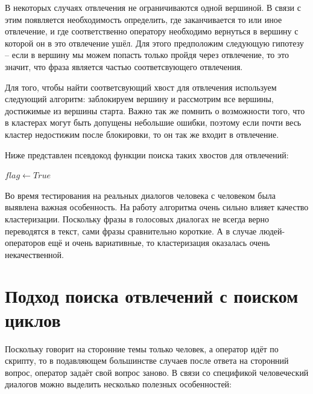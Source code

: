 \documentclass[specification,annotation]{itmo-student-thesis}
\begin{document}
	В некоторых случаях отвлечения не ограничиваются одной вершиной. В связи с этим появляется необходимость определить, где заканчивается то или иное отвлечение, и где соответственно оператору необходимо вернуться в вершину с которой он в это отвлечение ушёл. Для этого предположим следующую гипотезу -- если в вершину мы можем попасть только пройдя через отвлечение, то это значит, что фраза является частью соответсвующего отвлечения. 
	
	Для того, чтобы найти соответсвующий хвост для отвлечения используем следующий алгоритм: заблокируем вершину и рассмотрим все вершины, достижимые из вершины старта. Важно так же помнить о возможности того, что в кластерах могут быть допущены небольшие ошибки, поэтому если почти весь кластер недостижим после блокировки, то он так же входит в отвлечение.
	
	Ниже представлен псевдокод функции поиска таких хвостов для отвлечений:
	
	\begin{algorithmic}
		\State $flag\gets True$
		\Else
		\EndIf
		\EndFor
	\EndFor
		\Else
			\EndIf
		\EndIf
	\EndFor
	\State {}
	\EndFunction
\end{algorithmic}	
	
	Во время тестирования на реальных диалогов человека с человеком была выявлена важная особенность. На работу алгоритма очень сильно влияет качество кластеризации. Поскольку фразы в голосовых диалогах не всегда верно переводятся в текст, сами фразы сравнительно короткие. А в случае людей-операторов ещё и очень вариативные, то кластеризация оказалась очень некачественной.
	
	\section{Подход поиска отвлечений с поиском циклов}
	Поскольку говорит на сторонние темы только человек, а оператор идёт по скрипту, то в подавляющем большинстве случаев после ответа на сторонний вопрос, оператор задаёт свой вопрос заново. В связи со спецификой человеческий диалогов можно выделить несколько полезных особенностей:
	
\end{document}

